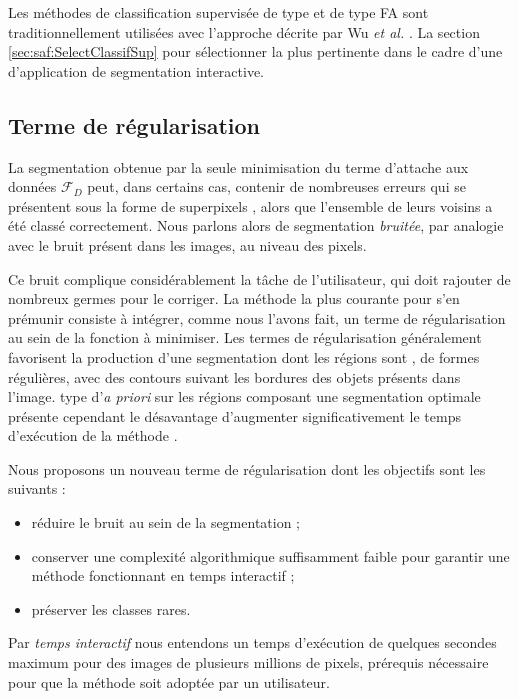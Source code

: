 Les méthodes de classification supervisée de type  et de type FA sont traditionnellement utilisées avec l'approche décrite par Wu \textit{et al.} \cite{wu2004probability}. La section \ref{sec:saf:SelectClassifSup}  pour sélectionner la plus pertinente dans le cadre d'une d'application de segmentation interactive. 
 
\subsection{Terme de régularisation}

La segmentation obtenue par la seule minimisation du terme d'attache aux données $\mathcal{F}_{D}$ peut, dans certains cas, contenir de nombreuses erreurs qui se présentent sous la forme de superpixels , alors que l'ensemble de leurs voisins a été classé correctement. Nous parlons alors de segmentation \emph{bruitée}, par analogie avec le bruit présent dans les images, au niveau des pixels. 

Ce bruit complique considérablement la tâche de l'utilisateur, qui doit rajouter de nombreux germes pour le corriger. La méthode la plus courante pour s'en prémunir consiste à intégrer, comme nous l'avons fait, un terme de régularisation au sein de la fonction  à minimiser. Les termes de régularisation généralement  favorisent la production d'une segmentation dont les régions sont , de formes régulières, avec des contours suivant les bordures des objets présents dans l'image.  type d'\textit{a priori} sur les régions composant une segmentation optimale présente cependant le désavantage d'augmenter significativement le temps d'exécution de la méthode \cite{mille2015combination, santner2010interactive}. 

Nous proposons un nouveau terme de régularisation dont les objectifs sont les suivants :
\begin{itemize}
\item réduire le bruit au sein de la segmentation ;
\item conserver une complexité algorithmique suffisamment faible pour garantir une méthode fonctionnant en temps interactif ;
\item préserver les classes rares.
\end{itemize}

Par \emph{temps interactif} nous entendons un temps d'exécution de quelques secondes maximum pour des images de plusieurs millions de pixels, prérequis nécessaire pour que la méthode soit adoptée par un utilisateur.

